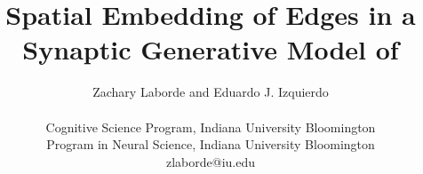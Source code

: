 \title{Spatial Embedding of Edges in a Synaptic Generative Model of \ce}
\author{Zachary Laborde and Eduardo J. Izquierdo\\
\mbox{}\\
Cognitive Science Program, Indiana University Bloomington\\
Program in Neural Science, Indiana University Bloomington\\
zlaborde@iu.edu}
